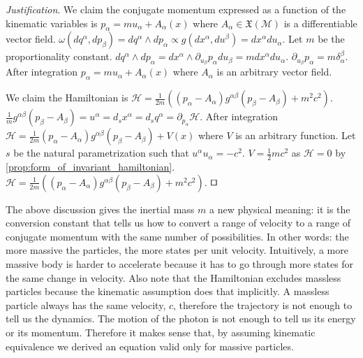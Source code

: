 \documentclass[smallextended]{svjour3}
\numberwithin{equation}{section}
\newenvironment{justification}{\emph{Justification}.}{\hfill\(\qed\)}
\theoremstyle{definition}
\newenvironment{justification}{\emph{Justification}.}{\qed}
\begin{document}
\begin{justification}
	We claim the conjugate momentum expressed as a function of the kinematic variables is $p_\alpha = m u_\alpha + A_\alpha(x)$ where $A_\alpha \in \mathfrak{X}(\mathcal{M})$ is a differentiable vector field. $\omega(dq^\alpha, dp_\beta) = dq^\alpha \wedge dp_\alpha \propto g(dx^\alpha, du^\beta) = dx^\alpha du_\alpha$. Let $m$ be the proportionality constant. $dq^\alpha \wedge dp_\alpha = dx^\alpha \wedge \partial_{u_\beta} p_\alpha du_\beta = m dx^\alpha du_\alpha$. $\partial_{u_\beta} p_\alpha = m \delta_\alpha^\beta$. After integration $p_\alpha = m u_\alpha + A_\alpha(x)$ where $A_\alpha$ is an arbitrary vector field.
	
	We claim the Hamiltonian is $\mathcal{H}=\frac{1}{2m}((p_\alpha-A_\alpha)g^{\alpha\beta}(p_\beta-A_\beta) + m^2 c^2)$.  $\frac{1}{m}g^{\alpha\beta}(p_\beta-A_\beta) = u^\alpha = d_s x^\alpha = d_s q^\alpha = \partial_{p_\alpha} \mathcal{H}$. After integration $\mathcal{H}=\frac{1}{2m}(p_\alpha-A_\alpha)g^{\alpha\beta}(p_\beta-A_\beta)+V(x)$ where $V$ is an arbitrary function. Let $s$ be the natural parametrization such that $u^\alpha u_\alpha = - c^2$. $V= \frac{1}{2}m c^2$ as $\mathcal{H}=0$ by \ref{prop:form_of_invariant_hamiltonian}. $\mathcal{H}=\frac{1}{2m}((p_\alpha-A_\alpha)g^{\alpha\beta}(p_\beta-A_\beta) + m^2 c^2)$.
\end{justification}

The above discussion gives the inertial mass $m$ a new physical meaning: it is the conversion constant that tells us how to convert a range of velocity to a range of conjugate momentum with the same number of possibilities. In other words: the more massive the particles, the more states per unit velocity. Intuitively, a more massive body is harder to accelerate because it has to go through more states for the same change in velocity. Also note that the Hamiltonian excludes massless particles because the kinematic assumption does that implicitly. A massless particle always has the same velocity, $c$, therefore the trajectory is not enough to tell us the dynamics. The motion of the photon is not enough to tell us its energy or its momentum. Therefore it makes sense that, by assuming kinematic equivalence we derived an equation valid only for massive particles.
\end{document}
